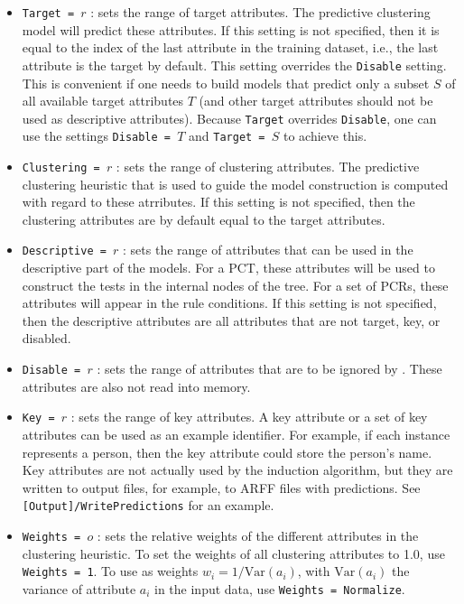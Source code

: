 \begin{itemize}
	\item {\tt Target = $r$} : sets the range of target attributes. The predictive clustering model will predict these attributes. If this setting is not specified, then it is equal to the index of the last attribute in the training dataset, i.e., the last attribute is the target by default. This setting overrides the \texttt{Disable} setting. This is convenient if one needs to build models that predict only a subset $S$ of all available target attributes $T$ (and other target attributes should not be used as descriptive attributes). Because {\tt Target} overrides {\tt Disable}, one can use the settings {\tt Disable = $T$} and {\tt Target = $S$} to achieve this. 
	
	\item {\tt Clustering = $r$} : sets the range of clustering attributes. The predictive clustering heuristic that is used to guide the model construction is computed with regard to these atrributes. If this setting is not specified, then the clustering attributes are by default equal to the target attributes.
	
	\item {\tt Descriptive = $r$} : sets the range of attributes that can be used in the descriptive part of the models. For a PCT, these attributes will be used to construct the tests in the internal nodes of the tree. For a set of PCRs, these attributes will appear in the rule conditions. If this setting is not specified, then the descriptive attributes are all attributes that are not target, key, or disabled.
	
	\item {\tt Disable = $r$} : sets the range of attributes that are to be ignored by \clus. These attributes are also not read into memory.
	
	\item {\tt Key = $r$} : sets the range of key attributes. A key attribute or a set of key attributes can be used as an example identifier. For example, if each instance represents a person, then the key attribute could store the person's name. Key attributes are not actually used by the induction algorithm, but they are written to output files, for example, to ARFF files with predictions. See \texttt{[Output]/WritePredictions} for an example.
	
	\item {\tt Weights = $o$} : sets the relative weights of the different attributes in the clustering heuristic. To set the weights of all clustering attributes to 1.0, use {\tt Weights = 1}. To use as  weights $w_i = 1/\mathrm{Var}(a_i)$, with $\mathrm{Var}(a_i)$ the variance of attribute $a_i$ in the input data, use {\tt Weights = Normalize}.
\end{itemize}
